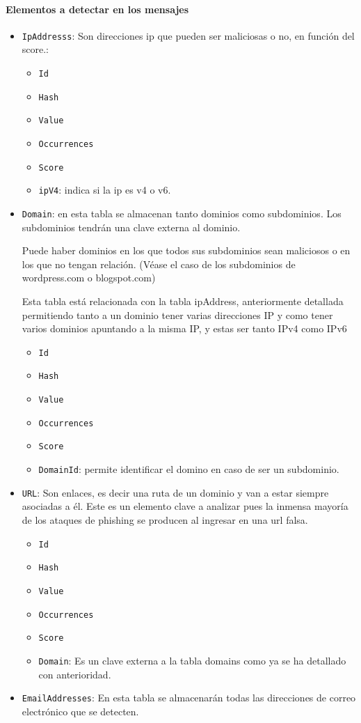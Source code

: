 \paragraph{Elementos a detectar en los mensajes}
\begin{itemize}
    \item \texttt{IpAddresss}: Son direcciones ip que pueden ser maliciosas o no, en función del score.: 
\begin{itemize}
    \item \texttt{Id}
    \item \texttt{Hash}
    \item \texttt{Value}
    \item \texttt{Occurrences}
    \item \texttt{Score}
    \item \texttt{ipV4}: indica si la ip es v4 o v6.
\end{itemize}
\item \texttt{Domain}: en esta tabla se almacenan tanto dominios como subdominios. Los subdominios tendrán una clave externa al dominio. 

Puede haber dominios en los que todos sus subdominios sean maliciosos o en los que no tengan relación. (Véase el caso de los subdominios de wordpress.com o blogspot.com)

Esta tabla está relacionada con la tabla ipAddress, anteriormente detallada permitiendo tanto a un dominio tener varias direcciones IP y como tener varios dominios apuntando a la misma IP, y estas ser tanto IPv4 como IPv6

\begin{itemize}
    \item \texttt{Id}
    \item \texttt{Hash}
    \item \texttt{Value}
    \item \texttt{Occurrences}
    \item \texttt{Score}
    \item \texttt{DomainId}: permite identificar el domino en caso de ser un subdominio.
\end{itemize}
\item \texttt{URL}: Son enlaces, es decir una ruta de un dominio y van a estar siempre asociadas a él. Este es un elemento clave a analizar pues la inmensa mayoría de los ataques de phishing se producen al ingresar en una url falsa.
\begin{itemize}
    \item \texttt{Id}
    \item \texttt{Hash}
    \item \texttt{Value}
    \item \texttt{Occurrences}
    \item \texttt{Score}
    \item \texttt{Domain}: Es un clave externa a la tabla domains como ya se ha detallado con anterioridad.
\end{itemize}
\item \texttt{EmailAddresses}: En esta tabla se almacenarán todas las direcciones de correo electrónico que se detecten. 


\end{itemize}
